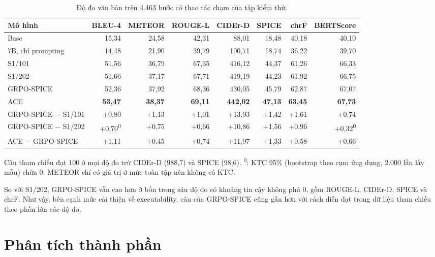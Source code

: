 \begin{table}[htbp]
\centering\footnotesize
\caption{Độ đo văn bản trên 4.463 bước có thao tác chạm của tập kiểm thử.}\label{tab:6.van}
\setlength{\tabcolsep}{2.2pt}
\begin{tabular}{@{}lrrrrrrr@{}}
\toprule
\textbf{Mô hình} & \textbf{BLEU-4} & \textbf{METEOR} & \textbf{ROUGE-L} & \textbf{CIDEr-D} & \textbf{SPICE} & \textbf{chrF} & \textbf{BERTScore} \\
\midrule
Base & 15,34 & 24,58 & 42,31 & 88,01 & 18,48 & 40,18 & 40,10 \\
7B, chỉ prompting & 14,48 & 21,90 & 39,79 & 100,71 & 18,74 & 36,22 & 39,70 \\
S1/101 & 51,56 & 36,79 & 67,35 & 416,12 & 44,37 & 61,26 & 66,33 \\
S1/202 & 51,66 & 37,17 & 67,71 & 419,19 & 44,23 & 61,92 & 66,75 \\
GRPO-SPICE & 52,36 & 37,92 & 68,36 & 430,05 & 45,79 & 62,87 & 67,07 \\
ACE & \textbf{53,47} & \textbf{38,37} & \textbf{69,11} & \textbf{442,02} & \textbf{47,13} & \textbf{63,45} & \textbf{67,73} \\
\midrule
GRPO-SPICE $-$ S1/101 & +0,80 & +1,13 & +1,01 & +13,93 & +1,42 & +1,61 & +0,74 \\
GRPO-SPICE $-$ S1/202 & +0,70\textsuperscript{0} & +0,75 & +0,66 & +10,86 & +1,56 & +0,96 & +0,32\textsuperscript{0} \\
ACE $-$ GRPO-SPICE & +1,11 & +0,45 & +0,74 & +11,97 & +1,33 & +0,58 & +0,66 \\
\bottomrule
\end{tabular}

\smallskip
\begin{minipage}{\linewidth}\footnotesize Câu tham chiếu đạt 100 ở mọi độ đo trừ CIDEr-D (988,7) và SPICE (98,6). \textsuperscript{0}: KTC 95\% (bootstrap theo cụm ứng dụng, 2.000 lần lấy mẫu) chứa 0. METEOR chỉ có giá trị ở mức toàn tập nên không có KTC.\end{minipage}
\end{table}

So với S1/202, GRPO-SPICE vẫn cao hơn ở bốn trong sáu độ đo có khoảng tin cậy không phủ 0, gồm ROUGE-L, CIDEr-D, SPICE và chrF. Như vậy, bên cạnh mức cải thiện về executability, câu của GRPO-SPICE cũng gần hơn với cách diễn đạt trong dữ liệu tham chiếu theo phần lớn các độ đo.

\section{Phân tích thành phần}\label{sec:6.3}\label{sec:6.5}


